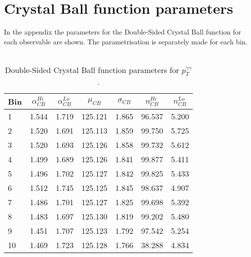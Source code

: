 \chapter{Crystal Ball function parameters}
\label{CB_parameters_appendix}
In the appendix the parameters for the Double-Sided Crystal Ball function for each observable are shown. The parametrisation is separately made for each bin.
\phantom{i}
\\
\phantom{i}
\\
\phantom{gaia}
\begin{table}[h]
\centering
\small
\caption{Double-Sided Crystal Ball function parameters for $p_T^{\gamma\gamma}$.}
\vspace{0.4cm}
\begin{tabular}{l | cccccc}
Bin &  $\alpha_{CB}^{Hi}$ &  $\alpha_{CB}^{Lo}$ &  $\mu_{CB}$ &  $\sigma_{CB}$ &  $n_{CB}^{Hi}$ &  $n_{CB}^{Lo}$ \\
\hline
1   &                     1.544 &                     1.719 &     125.121 &          1.865 &                96.537 &                 5.200 \\
2   &                     1.520 &                     1.691 &     125.113 &          1.859 &                99.750 &                 5.725 \\
3   &                     1.520 &                     1.693 &     125.126 &          1.858 &                99.732 &                 5.612 \\
4   &                     1.499 &                     1.689 &     125.126 &          1.841 &                99.877 &                 5.411 \\
5   &                     1.496 &                     1.702 &     125.127 &          1.842 &                99.825 &                 5.433 \\
6   &                     1.512 &                     1.745 &     125.125 &          1.845 &                98.637 &                 4.907 \\
7   &                     1.486 &                     1.701 &     125.127 &          1.825 &                99.698 &                 5.392 \\
8   &                     1.483 &                     1.697 &     125.130 &          1.819 &                99.202 &                 5.480 \\
9   &                     1.451 &                     1.707 &     125.123 &          1.792 &                97.542 &                 5.254 \\
10   &                     1.469 &                     1.723 &     125.128 &          1.766 &                38.288 &                 4.834 \\

\end{tabular}
\end{table}
